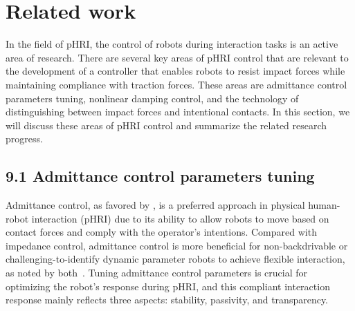 \section{Related work}
In the field of pHRI, the control of robots during interaction tasks is an active area of research. There are several key areas of pHRI control that are relevant to the development of a controller that enables robots to resist impact forces while maintaining compliance with traction forces. These areas are admittance control parameters tuning, nonlinear damping control, and the technology of distinguishing between impact forces and intentional contacts.
In this section, we will discuss these areas of pHRI control and summarize the related research progress.

\subsection{9.1 Admittance control parameters tuning}
Admittance control, as favored by \cite{chen2022human}, is a preferred approach in physical human-robot interaction (pHRI) due to its ability to allow robots to move based on contact forces and comply with the operator's intentions. 
Compared with impedance control, admittance control is more beneficial for non-backdrivable or challenging-to-identify dynamic parameter robots to achieve flexible interaction, as noted by both~\cite{chen2020compliance,arduengo2021human}.  Tuning admittance control parameters is crucial for optimizing the robot's response during pHRI, and this compliant interaction response mainly reflects three aspects: stability, passivity, and transparency.

